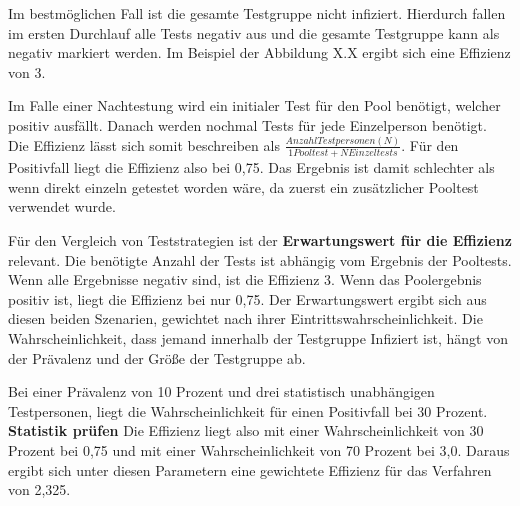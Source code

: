 Im bestmöglichen Fall ist die gesamte Testgruppe nicht infiziert.
Hierdurch fallen im ersten Durchlauf alle Tests negativ aus und die gesamte Testgruppe kann als negativ markiert werden.
Im Beispiel der Abbildung X.X ergibt sich eine Effizienz von 3.

Im Falle einer Nachtestung wird ein initialer Test für den Pool benötigt, welcher positiv ausfällt.
Danach werden nochmal Tests für jede Einzelperson benötigt.
Die Effizienz lässt sich somit beschreiben als $\frac{Anzahl Testpersonen (N)}{1 Pooltest + N Einzeltests} $.
Für den Positivfall liegt die Effizienz also bei 0,75.
Das Ergebnis ist damit schlechter als wenn direkt einzeln getestet worden wäre, da zuerst ein zusätzlicher Pooltest verwendet wurde.

Für den Vergleich von Teststrategien ist der \textbf{Erwartungswert für die Effizienz} relevant.
Die benötigte Anzahl der Tests ist abhängig vom Ergebnis der Pooltests.
Wenn alle Ergebnisse negativ sind, ist die Effizienz 3. Wenn das Poolergebnis positiv ist, liegt die Effizienz bei nur 0,75.
Der Erwartungswert ergibt sich aus diesen beiden Szenarien, gewichtet nach ihrer Eintrittswahrscheinlichkeit.
Die Wahrscheinlichkeit, dass jemand innerhalb der Testgruppe Infiziert ist, hängt von der Prävalenz und der Größe der Testgruppe ab.

Bei einer Prävalenz von 10 Prozent und drei statistisch unabhängigen Testpersonen, liegt die Wahrscheinlichkeit für einen Positivfall bei 30 Prozent. \textbf{Statistik prüfen}
Die Effizienz liegt also mit einer Wahrscheinlichkeit von 30 Prozent bei 0,75 und mit einer Wahrscheinlichkeit von 70 Prozent bei 3,0.
Daraus ergibt sich unter diesen Parametern eine gewichtete Effizienz für das Verfahren von 2,325.

\cleardoublepage
